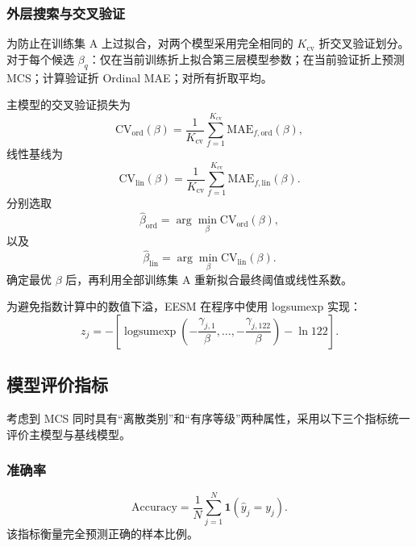 \documentclass[bwprint]{gmcmthesis}
\numberwithin{figure}{section}
\begin{document}
\subsubsection{外层搜索与交叉验证}

为防止在训练集 A 上过拟合，对两个模型采用完全相同的 $K_{\mathrm{cv}}$ 折交叉验证划分。对于每个候选 $\beta_q$：仅在当前训练折上拟合第三层模型参数；在当前验证折上预测 MCS；计算验证折 Ordinal MAE；对所有折取平均。

主模型的交叉验证损失为
\begin{equation}
	\mathrm{CV}_{\mathrm{ord}}(\beta)
	=
	\frac{1}{K_{\mathrm{cv}}}\sum_{f=1}^{K_{\mathrm{cv}}}\mathrm{MAE}_{f,\mathrm{ord}}(\beta),
\end{equation}
线性基线为
\begin{equation}
	\mathrm{CV}_{\mathrm{lin}}(\beta)
	=
	\frac{1}{K_{\mathrm{cv}}}\sum_{f=1}^{K_{\mathrm{cv}}}\mathrm{MAE}_{f,\mathrm{lin}}(\beta).
\end{equation}
分别选取
\begin{equation}
	\boxed{\widehat\beta_{\mathrm{ord}}=\arg\min_\beta \mathrm{CV}_{\mathrm{ord}}(\beta),}
	\label{eq:beta-ord}
\end{equation}
以及
\begin{equation}
	\boxed{\widehat\beta_{\mathrm{lin}}=\arg\min_\beta \mathrm{CV}_{\mathrm{lin}}(\beta).}
	\label{eq:beta-lin}
\end{equation}
确定最优 $\beta$ 后，再利用全部训练集 A 重新拟合最终阈值或线性系数。

为避免指数计算中的数值下溢，EESM 在程序中使用 logsumexp 实现：
\begin{equation}
	z_j=-\left[\operatorname{logsumexp}\left(-\frac{\gamma_{j,1}}{\beta},\ldots,-\frac{\gamma_{j,122}}{\beta}\right)-\ln 122\right].
	\label{eq:logsumexp}
\end{equation}

\subsection{模型评价指标}

考虑到 MCS 同时具有``离散类别''和``有序等级''两种属性，采用以下三个指标统一评价主模型与基线模型。

\subsubsection{准确率}

\begin{equation}
	\boxed{
	\mathrm{Accuracy}=\frac{1}{N}\sum_{j=1}^{N}\mathbf{1}\left(\widehat y_j=y_j\right).
	}
	\label{eq:acc}
\end{equation}
该指标衡量完全预测正确的样本比例。
\end{document}
